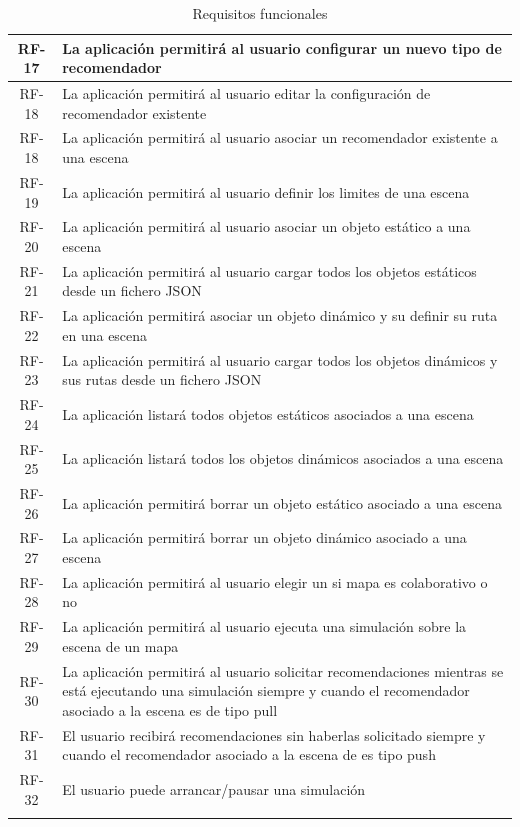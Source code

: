 \begin{longtable}[H]{|c|p{10cm}|}
RF-17 & La aplicación permitirá al usuario configurar un nuevo tipo de recomendador\\ \hline
RF-18 & La aplicación permitirá al usuario editar la configuración de recomendador existente\\ \hline
RF-18 & La aplicación permitirá al usuario asociar un recomendador existente a una escena\\ \hline
RF-19 & La aplicación permitirá al usuario definir los limites de una escena\\ \hline
RF-20 & La aplicación permitirá al usuario asociar un objeto estático a una escena\\ \hline
RF-21 & La aplicación permitirá al usuario cargar todos los objetos estáticos desde un fichero JSON\\ \hline
RF-22 & La aplicación permitirá asociar un objeto dinámico y su definir su ruta en una escena\\ \hline
RF-23 & La aplicación permitirá al usuario cargar todos los objetos dinámicos y sus rutas desde un fichero JSON\\ \hline
RF-24 & La aplicación listará todos objetos estáticos asociados a una escena \\ \hline
RF-25 & La aplicación listará todos los objetos dinámicos asociados a una escena \\ \hline
RF-26 & La aplicación permitirá borrar un objeto estático asociado a una escena\\ \hline
RF-27 & La aplicación permitirá borrar un objeto dinámico asociado a una escena\\ \hline
RF-28 & La aplicación permitirá al usuario elegir un si mapa es colaborativo o no\\ \hline
RF-29 & La aplicación permitirá al usuario ejecuta una simulación sobre la escena de un mapa\\ \hline
RF-30 & La aplicación permitirá al usuario solicitar recomendaciones mientras se está ejecutando una simulación siempre y cuando el recomendador asociado a la escena es de tipo pull\\ \hline
RF-31 & El usuario recibirá recomendaciones sin haberlas solicitado siempre y cuando el recomendador asociado a la escena de es tipo push\\ \hline
RF-32 & El usuario puede arrancar/pausar una simulación\\ \hline
\caption{Requisitos funcionales}
\label{tabla:requisitosFuncionales}
\end{longtable}

